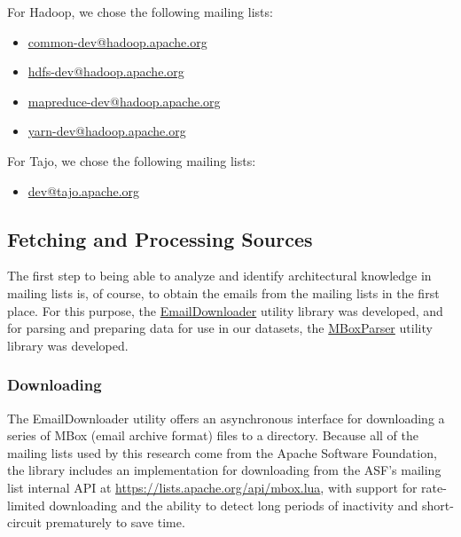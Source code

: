 \documentclass[a4paper, 12pt]{article}
\begin{document}
		For Hadoop, we chose the following mailing lists:
		\begin{itemize}
			\item \href{https://lists.apache.org/list.html?common-dev@hadoop.apache.org}{common-dev@hadoop.apache.org}
			\item \href{https://lists.apache.org/list.html?hdfs-dev@hadoop.apache.org}{hdfs-dev@hadoop.apache.org}
			\item \href{https://lists.apache.org/list.html?mapreduce-dev@hadoop.apache.org}{mapreduce-dev@hadoop.apache.org}
			\item \href{https://lists.apache.org/list.html?yarn-dev@hadoop.apache.org}{yarn-dev@hadoop.apache.org}
		\end{itemize}
	
		For Tajo, we chose the following mailing lists:
		\begin{itemize}
			\item \href{https://lists.apache.org/list.html?dev@tajo.apache.org}{dev@tajo.apache.org}
		\end{itemize}
	
	\subsection{Fetching and Processing Sources}
		The first step to being able to analyze and identify architectural knowledge in mailing lists is, of course, to obtain the emails from the mailing lists in the first place. For this purpose, the \href{https://github.com/ArchitecturalKnowledgeAnalysis/EmailDownloader}{EmailDownloader} utility library was developed, and for parsing and preparing data for use in our datasets, the \href{https://github.com/ArchitecturalKnowledgeAnalysis/MBoxParser}{MBoxParser} utility library was developed.
		
		\subsubsection{Downloading}
			The EmailDownloader utility offers an asynchronous interface for downloading a series of MBox (email archive format) files to a directory. Because all of the mailing lists used by this research come from the Apache Software Foundation, the library includes an implementation for downloading from the ASF's mailing list internal API at \href{https://lists.apache.org/api/mbox.lua}{https://lists.apache.org/api/mbox.lua}, with support for rate-limited downloading and the ability to detect long periods of inactivity and short-circuit prematurely to save time.
			
\end{document}
